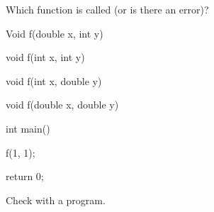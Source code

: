 Which function is called (or is there an error)?



\begin{consolethree}[escapeinside=||]

Void f(double x, int y) {}

void f(int x, int y) {}

void f(int x, double y) {}

void f(double x, double y) {}



int main()

{

    f(1, 1);



    return 0;

}

\end{consolethree}



Check with a program.

